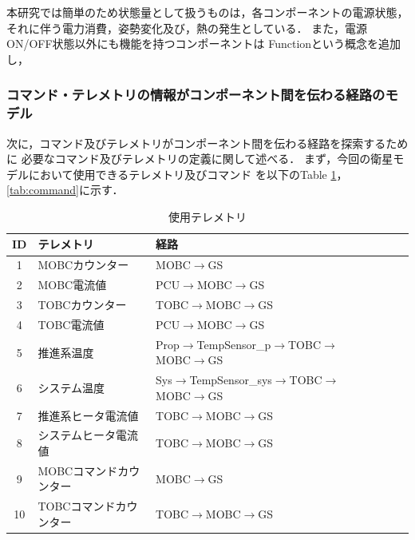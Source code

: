 \documentclass[11pt]{article}
\begin{document}
本研究では簡単のため状態量として扱うものは，各コンポーネントの電源状態，
それに伴う電力消費，姿勢変化及び，熱の発生としている．
また，電源ON/OFF状態以外にも機能を持つコンポーネントは
Functionという概念を追加し，

\subsubsection{コマンド・テレメトリの情報がコンポーネント間を伝わる経路のモデル}
次に，コマンド及びテレメトリがコンポーネント間を伝わる経路を探索するために
必要なコマンド及びテレメトリの定義に関して述べる．
まず，今回の衛星モデルにおいて使用できるテレメトリ及びコマンド
を以下のTable \ref{tab:telemetry}，\ref{tab:command}に示す．

\begin{table}[H]
   \centering
   \caption{使用テレメトリ}
   \label{tab:telemetry}
      \begin{tabular}{cllcccc} \hline
         ID&テレメトリ&経路\\ \hline
         1&MOBCカウンター&MOBC$\rightarrow$GS\\
         2&MOBC電流値&PCU$\rightarrow$MOBC$\rightarrow$GS\\
         3&TOBCカウンター&TOBC$\rightarrow$MOBC$\rightarrow$GS\\
         4&TOBC電流値&PCU$\rightarrow$MOBC$\rightarrow$GS\\
         5&推進系温度&Prop$\rightarrow$TempSensor\_p$\rightarrow$TOBC$\rightarrow$MOBC$\rightarrow$GS\\
         6&システム温度&Sys$\rightarrow$TempSensor\_sys$\rightarrow$TOBC$\rightarrow$MOBC$\rightarrow$GS\\
         7&推進系ヒータ電流値&TOBC$\rightarrow$MOBC$\rightarrow$GS\\
         8&システムヒータ電流値&TOBC$\rightarrow$MOBC$\rightarrow$GS\\
         9&MOBCコマンドカウンター&MOBC$\rightarrow$GS\\
         10&TOBCコマンドカウンター&TOBC$\rightarrow$MOBC$\rightarrow$GS\\ \hline
      \end{tabular}
\end{table}
\end{document}

